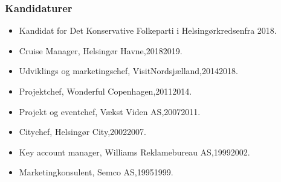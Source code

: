 \documentclass[11pt, a4paper]{awesome-cv}
\begin{document}
\begin{cvletter}
\subsubsection*{Kandidaturer}
\begin{itemize}
\item Kandidat for Det Konservative Folkeparti i Helsingørkredsenfra 2018.
\end{itemize}
\begin{itemize}
\item Cruise Manager, Helsingør Havne,20182019.
\item Udviklings og marketingschef, VisitNordsjælland,20142018.
\item Projektchef, Wonderful Copenhagen,20112014.
\item Projekt og eventchef, Vækst  Viden AS,20072011.
\item Citychef, Helsingør City,20022007.
\item Key account manager, Williams Reklamebureau AS,19992002.
\item Marketingkonsulent, Semco AS,19951999.
\end{itemize}
\end{cvletter}
\end{document}
